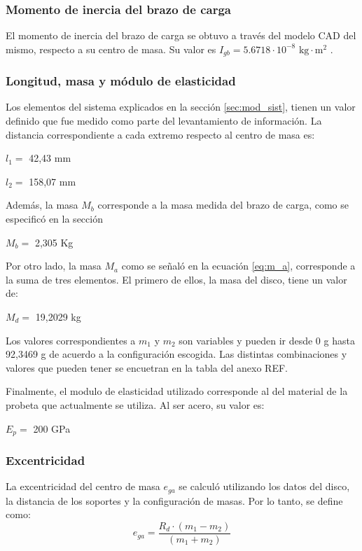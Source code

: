 \subsubsection{Momento de inercia del brazo de carga}
El momento de inercia del brazo de carga se obtuvo a través del modelo CAD del mismo, respecto a su centro de masa. Su valor es $I_{gb} = 5.6718\cdot 10^{-8} \text{ kg}\cdot \text{m}^2$ . 

\subsubsection{Longitud, masa y módulo de elasticidad}
Los elementos del sistema explicados en la sección \ref{sec:mod_sist}, tienen un valor definido que fue medido como parte del levantamiento de información. La distancia correspondiente a cada extremo respecto al centro de masa es:
\begin{itemize*}
	\item $l_1=$ 42,43 mm
	\item $l_2=$ 158,07 mm
\end{itemize*}
Además, la masa $M_b$ corresponde a la masa medida del brazo de carga, como se especificó en la sección
\begin{itemize*}
	\item $M_b=$ 2,305 Kg
\end{itemize*}
Por otro lado, la masa $M_a$ como se señaló en la ecuación \ref{eq:m_a}, corresponde a la suma de tres elementos. El primero de ellos, la masa del disco, tiene un valor de:
\begin{itemize*}
	\item $M_d=$ 19,2029 kg
\end{itemize*}
Los valores correspondientes a $m_1$ y $m_2$ son variables y pueden ir desde 0 g hasta 92,3469 g de acuerdo a la configuración escogida. Las distintas combinaciones y valores que pueden tener se encuetran en la tabla del anexo REF.

Finalmente, el modulo de elasticidad utilizado corresponde al del material de la probeta que actualmente se utiliza. Al ser acero, su valor es:
\begin{itemize*}
	\item $E_p=$ 200 GPa
\end{itemize*}
\subsubsection{Excentricidad}
La excentricidad del centro de masa $e_{ga}$ se calculó utilizando los datos del disco, la distancia de los soportes y la configuración de masas. Por lo tanto, se define como:
\begin{equation}
	e_{ga} = \frac{R_d\cdot (m_1 - m_2)}{(m_1 + m_2)}
\end{equation}
